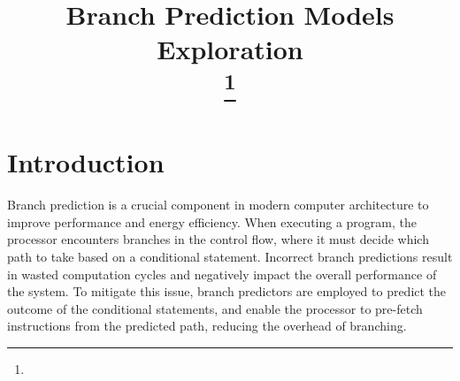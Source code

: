 \documentclass[conference]{IEEEtran}
\begin{document}
\title{Branch Prediction Models Exploration\\
\thanks{}
}
\author{
\and
{}
\and
{}
\and
{}
\and
{}
}

\maketitle

\begin{abstract}
\end{abstract}

\section{Introduction} \label{sec:introduction}
Branch prediction is a crucial component in modern computer architecture to improve performance and energy efficiency. When executing a program, the processor encounters branches in the control flow, where it must decide which path to take based on a conditional statement. Incorrect branch predictions result in wasted computation cycles and negatively impact the overall performance of the system. To mitigate this issue, branch predictors are employed to predict the outcome of the conditional statements, and enable the processor to pre-fetch instructions from the predicted path, reducing the overhead of branching.
\end{document}
